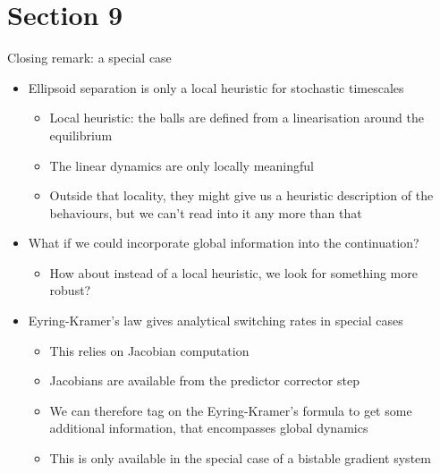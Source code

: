 \documentclass[presentation]{beamer}
\begin{document}
\section{Section 9}
\label{sec:org950e8c8}
\begin{frame}[label={sec:org5d62146},plain]{Closing remark: a special case}
\begin{itemize}
\item Ellipsoid separation is only a local heuristic for stochastic timescales
\begin{itemize}
\item Local heuristic: the balls are defined from a linearisation around the equilibrium
\item The linear dynamics are only locally meaningful
\item Outside that locality, they might give us a heuristic description of the behaviours, but we can't read into it any more than that
\end{itemize}
\item What if we could incorporate global information into the continuation?
\begin{itemize}
\item How about instead of a local heuristic, we look for something more robust?
\end{itemize}
\item Eyring-Kramer's law gives analytical switching rates in special cases
\begin{itemize}
\item This relies on Jacobian computation
\item Jacobians are available from the predictor corrector step
\item We can therefore tag on the Eyring-Kramer's formula to get some additional information, that encompasses global dynamics
\item This is only available in the special case of a bistable gradient system
\end{itemize}
\end{itemize}
\end{frame}
\end{document}
